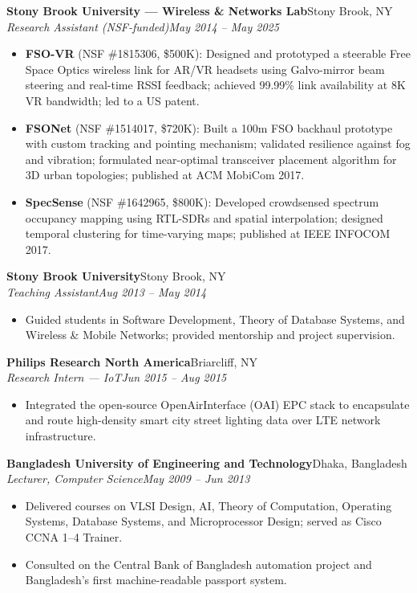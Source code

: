 \documentclass[10.5pt,letterpaper]{article}
\newcommand{\entrytitle}[2]{%
  \textbf{#1}\hfill #2%
}
\newcommand{\entrysub}[2]{%
  \vspace{1pt}\textit{#1}\hfill \textit{#2}%
}
\begin{document}
%
\vspace{2pt}
%
\entrytitle{Stony Brook University --- Wireless \& Networks Lab}{Stony Brook, NY}\\
\entrysub{Research Assistant (NSF-funded)}{May 2014 -- May 2025}
\begin{itemize}
    \item \textbf{FSO-VR} (NSF \#1815306, \$500K): Designed and prototyped a steerable Free Space Optics wireless link for AR/VR headsets using Galvo-mirror beam steering and real-time RSSI feedback; achieved 99.99\% link availability at 8K VR bandwidth; led to a US patent.
    \item \textbf{FSONet} (NSF \#1514017, \$720K): Built a 100m FSO backhaul prototype with custom tracking and pointing mechanism; validated resilience against fog and vibration; formulated near-optimal transceiver placement algorithm for 3D urban topologies; published at ACM MobiCom 2017.
    \item \textbf{SpecSense} (NSF \#1642965, \$800K): Developed crowdsensed spectrum occupancy mapping using RTL-SDRs and spatial interpolation; designed temporal clustering for time-varying maps; published at IEEE INFOCOM 2017.
\end{itemize}
%
\vspace{2pt}
%
\entrytitle{Stony Brook University}{Stony Brook, NY}\\
\entrysub{Teaching Assistant}{Aug 2013 -- May 2014}
\begin{itemize}
    \item Guided students in Software Development, Theory of Database Systems, and Wireless \& Mobile Networks; provided mentorship and project supervision.
\end{itemize}
%
\vspace{2pt}
%
\entrytitle{Philips Research North America}{Briarcliff, NY}\\
\entrysub{Research Intern --- IoT}{Jun 2015 -- Aug 2015}
\begin{itemize}
    \item Integrated the open-source OpenAirInterface (OAI) EPC stack to encapsulate and route high-density smart city street lighting data over LTE network infrastructure.
\end{itemize}
%
\vspace{2pt}
%
\entrytitle{Bangladesh University of Engineering and Technology}{Dhaka, Bangladesh}\\
\entrysub{Lecturer, Computer Science}{May 2009 -- Jun 2013}
\begin{itemize}
    \item Delivered courses on VLSI Design, AI, Theory of Computation, Operating Systems, Database Systems, and Microprocessor Design; served as Cisco CCNA 1--4 Trainer.
    \item Consulted on the Central Bank of Bangladesh automation project and Bangladesh's first machine-readable passport system.
\end{itemize}
\end{document}

